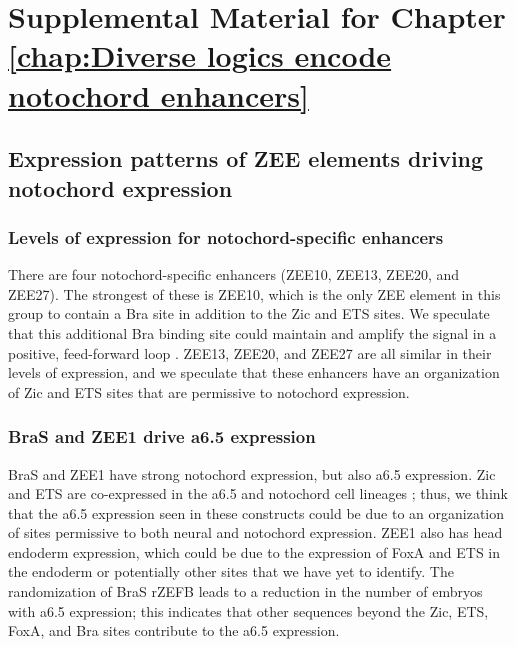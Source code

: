 \appendix{}

\chapter{Supplemental Material for Chapter \ref{chap:Diverse logics encode notochord enhancers}}

\section{Expression patterns of ZEE elements driving notochord expression}

\subsection{Levels of expression for notochord-specific enhancers}
There are four notochord-specific enhancers (ZEE10, ZEE13, ZEE20, and ZEE27). The strongest of these is ZEE10, which is the only ZEE element in this group to contain a Bra site in addition to the Zic and ETS sites. We speculate that this additional Bra binding site could maintain and amplify the signal in a positive, feed-forward loop \cite{reeves2017}. ZEE13, ZEE20, and ZEE27 are all similar in their levels of expression, and we speculate that these enhancers have an organization of Zic and ETS sites that are permissive to notochord expression. 

\subsection{BraS and ZEE1 drive a6.5 expression}
BraS and ZEE1 have strong notochord expression, but also a6.5 expression. Zic and ETS are co-expressed in the a6.5 and notochord cell lineages \cite{matsumoto2007a}; thus, we think that the a6.5 expression seen in these constructs could be due to an organization of sites permissive to both neural and notochord expression. ZEE1 also has head endoderm expression, which could be due to the expression of FoxA and ETS in the endoderm or potentially other sites that we have yet to identify. The randomization of BraS rZEFB leads to a reduction in the number of embryos with a6.5 expression; this indicates that other sequences beyond the Zic, ETS, FoxA, and Bra sites contribute to the a6.5 expression. 

